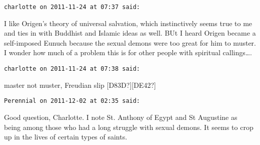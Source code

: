 \begin{footnotesize}\begin{sffamily}



\texttt{charlotte on 2011-11-24 at 07:37 said: }

I like Origen's theory of universal salvation, which instinctively seems true to me and ties in with Buddhist and Islamic ideas as well. BUt I heard Origen became a self-imposed Eunuch because the sexual demons were too great for him to muster. I wonder how much of a problem this is for other people with spiritual callings….


\hfill

\texttt{charlotte on 2011-11-24 at 07:38 said: }

master not muster, Freudian slip [D83D?][DE42?]


\hfill

\texttt{Perennial on 2011-12-02 at 02:35 said: }

Good question, Charlotte. I note St. Anthony of Egypt and St Augustine as being among those who had a long struggle with sexual demons. It seems to crop up in the lives of certain types of saints.


\end{sffamily}\end{footnotesize}
